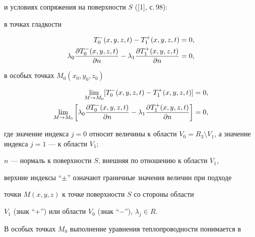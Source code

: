 и условиях сопряжения на поверхности $S$ ([1], с.\,98):





\noindent{}в точках гладкости


\begin{align}


T_{0}^{-} ({x,y,z,t})-T_{1}^{+} ({x,y,z,t})&= 0,\notag\\


%


\label{eq3}


\lambda_{0} \frac{{\partial T_{0}^{-} ({x,y,z,t} 


)}}{{\partial n}}-\lambda_{1} \frac{{\partial T_{1}^{+} (


{x,y,z,t})}}{{\partial n}}&=0,


\end{align}


в особых точках $M_{0} ({x_{0} ,y_{0} ,z_{0}})$


\begin{align}


\lim_{M \to M_{0}} [{T_{0}^{-} ({x,y,z,t} 


)-T_{1}^{+} ({x,y,z,t})}]&=0,\notag\\


%


\label{eq4}


\lim_{M \to M_{0}} \bigg[{\lambda_{0} \frac{{\partial 


T_{0}^{-} ({x,y,z,t})}}{{\partial n}}-\lambda_{1} 


\frac{{\partial T_{1}^{+} ({x,y,z,t})}}{{\partial n}}} \bigg]&=0,


\end{align} 


где значение индекса $j=0$ относит величины к области $V_{0}=R_{3} 


\setminus V_{1}$, а значение индекса $j=1$ --- к области $V_{1}$; 


$n$ --- нормаль к поверхности $S$, внешняя по отношению к области $V_{1} $, 


верхние индексы ``$\pm$'' означают граничные значения величин при подходе 


точки $M ({x,y,z})$ к точке поверхности $S$ со стороны области 


$V_{1} $ (знак ``$+$'') или области $V_{0} $ (знак ``$-$''), $\lambda_{j} \in R$.





В особых точках $M_{0} $ выполнение уравнения теплопроводности понимается в 


